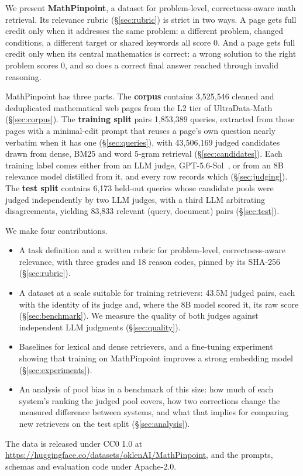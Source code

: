 We present \textbf{MathPinpoint}, a dataset for problem-level, correctness-aware math retrieval. Its relevance rubric (\S\ref{sec:rubric}) is strict in two ways. A page gets full credit only when it addresses the same problem: a different problem, changed conditions, a different target or shared keywords all score 0. And a page gets full credit only when its central mathematics is correct: a wrong solution to the right problem scores 0, and so does a correct final answer reached through invalid reasoning.

MathPinpoint has three parts. The \textbf{corpus} contains 3,525,546 cleaned and deduplicated mathematical web pages from the L2 tier of UltraData-Math~\citep{ultradata-math} (\S\ref{sec:corpus}). The \textbf{training split} pairs 1,853,389 queries, extracted from those pages with a minimal-edit prompt that reuses a page's own question nearly verbatim when it has one (\S\ref{sec:queries}), with 43,506,169 judged candidates drawn from dense, BM25 and word 5-gram retrieval (\S\ref{sec:candidates}). Each training label comes either from an LLM judge, GPT-5.6-Sol~\citep{openai2026gpt56}, or from an 8B relevance model distilled from it, and every row records which (\S\ref{sec:judging}). The \textbf{test split} contains 6,173 held-out queries whose candidate pools were judged independently by two LLM judges, with a third LLM arbitrating disagreements, yielding 83,833 relevant (query, document) pairs (\S\ref{sec:test}).

We make four contributions.
\begin{itemize}
    \item A task definition and a written rubric for problem-level, correctness-aware relevance, with three grades and 18 reason codes, pinned by its SHA-256 (\S\ref{sec:rubric}).
    \item A dataset at a scale suitable for training retrievers: 43.5M judged pairs, each with the identity of its judge and, where the 8B model scored it, its raw score (\S\ref{sec:benchmark}). We measure the quality of both judges against independent LLM judgments (\S\ref{sec:quality}).
    \item Baselines for lexical and dense retrievers, and a fine-tuning experiment showing that training on MathPinpoint improves a strong embedding model (\S\ref{sec:experiments}).
    \item An analysis of pool bias in a benchmark of this size: how much of each system's ranking the judged pool covers, how two corrections change the measured difference between systems, and what that implies for comparing new retrievers on the test split (\S\ref{sec:analysis}).
\end{itemize}

The data is released under CC0 1.0 at \url{https://huggingface.co/datasets/oklenAI/MathPinpoint}, and the prompts, schemas and evaluation code under Apache-2.0.
